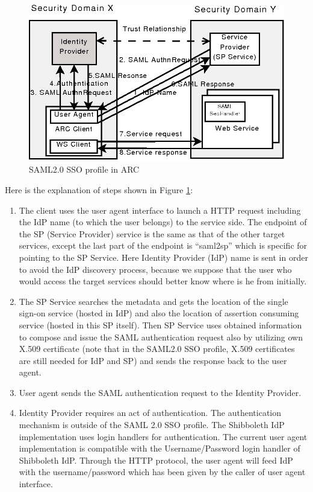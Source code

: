 \documentclass[twocolumn]{svjour3}         %
\begin{document}
\begin{figure}
\includegraphics[width=0.7\columnwidth]{SAML2SSO.png}
\caption{SAML2.0 SSO profile in ARC}
\label{fig:SAML2SSO}
\end{figure}
Here is the explanation of steps shown in Figure \ref{fig:SAML2SSO}:
\begin{enumerate}
\item The client uses the user agent interface to launch a HTTP request including the IdP name (to which the user belongs) to the service side. The endpoint of the SP (Service Provider) service is the same as that of the other target services, except the last part of the endpoint is ``saml2sp'' which is specific for pointing to the SP Service. Here Identity Provider (IdP) name is sent in order to avoid the IdP discovery process, because we suppose that the user who would access the target services should better know where is he from initially.
\item The SP Service searches the metadata and gets the location of the single sign-on service (hosted in IdP) and also the location of assertion consuming service (hosted in this SP itself). Then SP Service uses obtained information to compose and issue the SAML authentication request also by utilizing own X.509 certificate (note that in the SAML2.0 SSO profile, X.509 certificates are still needed for IdP and SP) and sends the response back to the user agent.
\item User agent sends the SAML authentication request to the Identity Provider.
\item Identity Provider requires an act of authentication. The authentication mechanism is outside of the SAML 2.0 SSO profile. The Shibboleth IdP implementation uses login handlers for authentication. The current user agent implementation is compatible with the Username/Password login handler of Shibboleth IdP. Through the HTTP protocol, the user agent will feed IdP with the username/password which has been given by the caller of user agent interface.

\end{enumerate}
\end{document}
